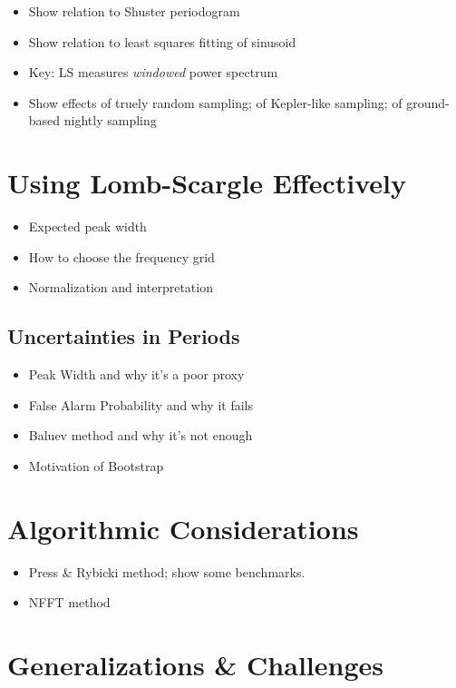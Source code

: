 \documentclass[preprint]{aastex}
\begin{document}
\begin{itemize}
  \item Show relation to Shuster periodogram
  \item Show relation to least squares fitting of sinusoid
  \item Key: LS measures {\it windowed} power spectrum
  \item Show effects of truely random sampling; of Kepler-like sampling; of ground-based nightly sampling
\end{itemize}


\section{Using Lomb-Scargle Effectively}

\begin{itemize}
  \item Expected peak width
  \item How to choose the frequency grid
  \item Normalization and interpretation
\end{itemize}


\subsection{Uncertainties in Periods}

\begin{itemize}
  \item Peak Width and why it's a poor proxy
  \item False Alarm Probability and why it fails
  \item Baluev method and why it's not enough
  \item Motivation of Bootstrap

\end{itemize}



\section{Algorithmic Considerations}

\begin{itemize}
\item Press \& Rybicki method; show some benchmarks.
\item NFFT method
\end{itemize}



\section{Generalizations \& Challenges}
\end{document}
